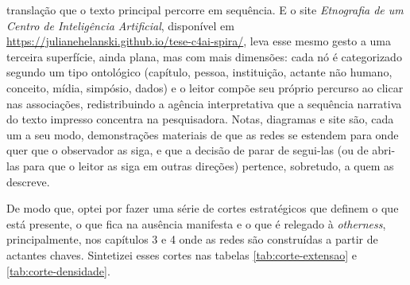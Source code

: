 translação \parencite{Latour2011CienciaEmAcao} que o texto principal percorre em sequência. E o site \textit{Etnografia de um Centro de Inteligência Artificial}, disponível em \url{https://julianehelanski.github.io/tese-c4ai-spira/}, leva esse mesmo gesto a uma terceira superfície, ainda plana, mas com mais dimensões: cada nó é categorizado segundo um tipo ontológico (capítulo, pessoa, instituição, actante não humano, conceito, mídia, simpósio, dados) e o leitor compõe seu próprio percurso ao clicar nas associações, redistribuindo a agência interpretativa que a sequência narrativa do texto impresso concentra na pesquisadora. Notas, diagramas e site são, cada um a seu modo, demonstrações materiais de que as redes se estendem para onde quer que o observador as siga, e que a decisão de parar de segui-las (ou de abri-las para que o leitor as siga em outras direções) pertence, sobretudo, a quem as descreve.

De modo que, optei por fazer uma série de cortes estratégicos que definem o que está presente, o que fica na ausência manifesta e o que é relegado à \textit{otherness}, principalmente, nos capítulos 3 e 4 onde as redes são construídas a partir de actantes chaves. Sintetizei esses cortes nas tabelas \ref{tab:corte-extensao} e \ref{tab:corte-densidade}.

\vspace{0.5cm}

